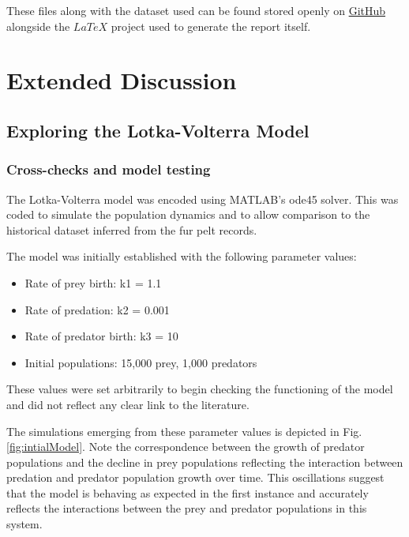 \documentclass{article}
\begin{document}
These files along with the dataset used can be found stored openly on \href{https://github.com/sarahajones/sysmic_miniproject}{GitHub} alongside the \href{https://github.com/sarahajones/SysMic-Miniproject}{$LaTeX$} project used to generate the report itself. 

\clearpage
\section{Extended Discussion}
\subsection{Exploring the Lotka-Volterra Model}
\subsubsection{Cross-checks and model testing}
The Lotka-Volterra model was encoded using MATLAB's ode45 solver. This was coded to simulate the population dynamics and to allow comparison to the historical dataset inferred from the fur pelt records. 

The model was initially established with the following parameter values:
\begin{itemize}
     \item Rate of prey birth: k1 = 1.1
     \item Rate of predation: k2 = 0.001
     \item Rate of predator birth: k3 = 10
     \item Initial populations: 15,000 prey, 1,000 predators
   \end{itemize}
   
These values were set arbitrarily to begin checking the functioning of the model and did not reflect any clear link to the literature. 

The simulations emerging from these parameter values is depicted in Fig. \ref{fig:intialModel}. Note the correspondence between the growth of predator populations and the decline in prey populations reflecting the interaction between predation and predator population growth over time. This oscillations suggest that the model is behaving as expected in the first instance and accurately reflects the interactions between the prey and predator populations in this system. 
\end{document}
